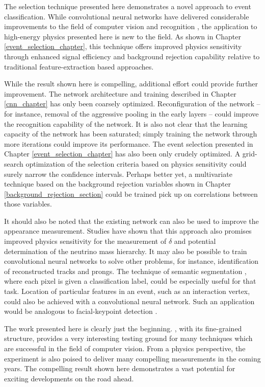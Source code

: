 The selection technique presented here demonstrates a novel approach
to event classification.
While convolutional neural networks have delivered considerable
improvements to the field of computer vision and recognition
\cite{lecun2015deep},
the application to high-energy physics presented here is new to the field.
As shown in Chapter \ref{event_selection_chapter},
this technique offers improved physics sensitivity
through enhanced signal efficiency and background rejection capability
relative to traditional feature-extraction based approaches.

While the result shown here is compelling, additional effort could provide
further improvement.
The network architecture and training described in Chapter \ref{cnn_chapter}
has only been coarsely optimized.
Reconfiguration of the network -- for instance, removal of the aggressive
pooling in the early layers -- could improve the recognition
capability of the network.
It is also not clear that the learning capacity of the network has
been saturated; simply training the network through more iterations
could improve its performance.
The event selection presented in Chapter \ref{event_selection_chapter}
has also been only crudely optimized.
A grid-search optimization of the selection criteria based
on physics sensitivity could surely narrow the confidence intervals.
Perhaps better yet, a multivariate technique based on the background rejection
variables shown in Chapter \ref{background_rejection_section}
could be trained pick up on correlations between those variables.

It should also be noted that the existing network can also
be used to improve the \nova \nue appearance measurement.
Studies have shown that this approach also promises improved
physics sensitivity for the measurement of $\delta$
and potential determination of the
neutrino mass hierarchy.
It may also be possible to train convolutional neural networks
to solve other problems, for instance, identification
of reconstructed tracks and prongs.
The technique of semantic segmentation \cite{long2015fully},
where each pixel is given a classification label, could be especially
useful for that task.
Location of particular features in an event, such as an interaction
vertex, could also be achieved with a convolutional neural network.
Such an application would be analogous to facial-keypoint detection
\cite{lecun2015deep}.

The work presented here is clearly just the beginning.
\nova, with its fine-grained structure, provides a very interesting
testing ground for many techniques which are successful in
the field of computer vision.
From a physics perspective, the experiment
is also poised to deliver many compelling measurements in the coming
years.
The compelling result shown here demonstrates a
vast potential for exciting developments on the road ahead.






